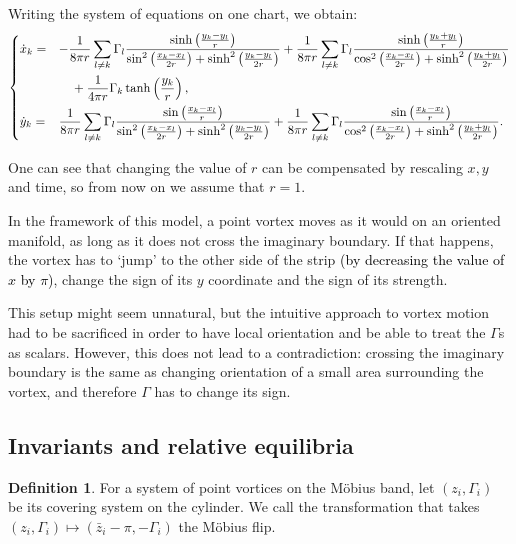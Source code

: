 \documentclass[11pt,twoside]{article}
\theoremstyle{definition}
\newtheorem{Def}[theorem]{Definition}
\newtheorem{rem}[theorem]{Remark}
\numberwithin{equation}{section}
\begin{document}
     Writing the system of equations on one chart, we obtain:
      \begin{equation}
      \label{Mot}
      \begin{dcases}
       \dot{x}_k =& -\frac{1}{8\pi r }\sum\limits_{l\ne k}\Gamma_l\frac{\sinh\left(\frac{y_k-y_l}{r}\right)}{\sin^2\left(\frac{x_k-x_l}{2r}\right)+ \sinh^2\left(\frac{y_k-y_l}{2r}\right)}  + \frac{1}{8\pi r }\sum\limits_{l\ne k} \Gamma_l\frac{\sinh\left(\frac{y_k+y_l}{r}\right)}{\cos^2\left(\frac{x_k-x_l}{2r}\right)+ \sinh^2\left(\frac{y_k+y_l}{2r}\right)}  \\
              &\quad {} + \frac{1}{4\pi r}\Gamma_k\tanh\left(\frac{y_k}{r}\right),\\
              \dot{y}_k =& \frac{1}{8\pi r }\sum\limits_{l\ne k}\Gamma_l\frac{\sin\left(\frac{x_k-x_l}{r}\right)}{\sin^2\left(\frac{x_k-x_l}{2r}\right)+ \sinh^2\left(\frac{y_k-y_l}{2r}\right)}  + \frac{1}{8\pi r }\sum\limits_{l\ne k}\Gamma_l\frac{\sin\left(\frac{x_k-x_l}{r}\right)}{\cos^2\left(\frac{x_k-x_l}{2r}\right)+ \sinh^2\left(\frac{y_k+
              y_l}{2r}\right)} .
              \end{dcases}
      \end{equation}
          
      One can see that changing the value of $r$ can be compensated by rescaling $x,y$ and time, so from now  on we assume that $r=1$.
      
In the framework of this model, a point vortex moves as it would on an oriented manifold, as long as it does not cross the imaginary boundary. If that happens, the vortex has to `jump' to the other side  of the strip \textcolor{black}{(by decreasing the value of $x$ by $\pi$)}, change the sign of its $y$ coordinate and the sign of its strength. 



This setup might seem unnatural, but the intuitive approach to vortex motion had to be sacrificed  in order to have local orientation and be able to treat the $\Gamma$s as scalars. However, this does not lead to a contradiction: crossing the imaginary boundary is the same as changing orientation of a small area surrounding the vortex, and therefore $\Gamma$ has to change its sign.







\subsection{Invariants and relative equilibria}
\begin{Def} 
For a system of point vortices on the M\"obius band, let $( z_i,\Gamma_i)$ be its covering system on the cylinder. We call the transformation that takes $(z_i,\Gamma_i)\mapsto  (\bar{z}_i - \pi,-\Gamma_i)$ the M\"obius flip.  
\end{Def}
\end{document}
